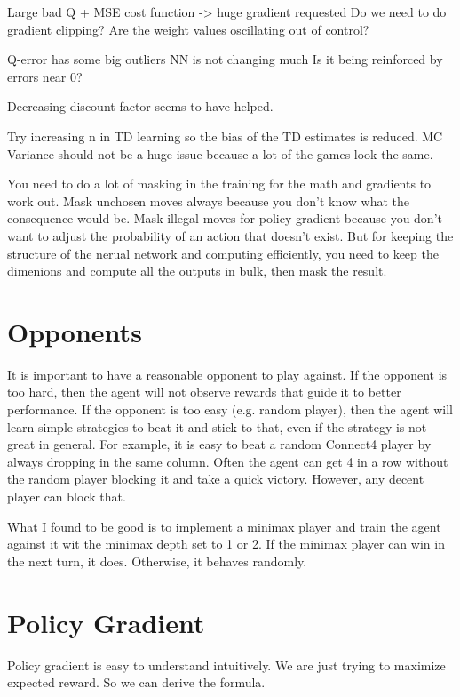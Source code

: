 \documentclass[12pt]{article}
\begin{document}
	Large bad Q + MSE cost function -> huge gradient requested
	Do we need to do gradient clipping?
	Are the weight values oscillating out of control?
	
	
	
	Q-error has some big outliers
	NN is not changing much
	Is it being reinforced by errors near 0?
	
	
	Decreasing discount factor seems to have helped.
	
	Try increasing n in TD learning so the bias of the TD estimates is reduced.
	MC Variance should not be a huge issue because a lot of the games look the same.
	
	You need to do a lot of masking in the training for the math and gradients to work out.
	Mask unchosen moves always because you don't know what the consequence would be.
	Mask illegal moves for policy gradient because you don't want to adjust the 
	probability of an action that doesn't exist. But for keeping the structure
	of the nerual network and computing efficiently, you need to keep the dimenions
	and compute all the outputs in bulk, then mask the result.

	\section{Opponents}
	
	It is important to have a reasonable opponent to play against. If the opponent is too hard, then the agent will not observe rewards that guide it to better performance. If the opponent is too easy (e.g. random player), then the agent will learn simple strategies to beat it and stick to that, even if the strategy is not great in general. For example, it is easy to beat a random Connect4 player by always dropping in the same column. Often the agent can get 4 in a row without the random player blocking it and take a quick victory. However, any decent player can block that.
	
	What I found to be good is to implement a minimax player and train the agent against it wit the minimax depth set to 1 or 2. If the minimax player can win in the next turn, it does. Otherwise, it behaves randomly. 
	
	\section{Policy Gradient}
	
	Policy gradient is easy to understand intuitively. We are just trying to maximize expected reward. So we can derive the formula.
	
\end{document}
